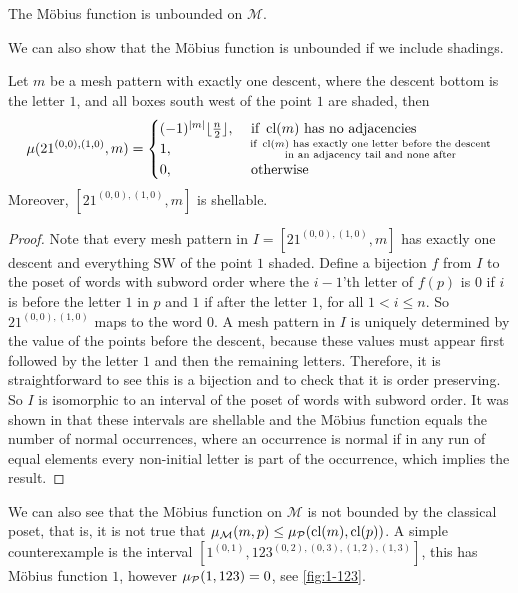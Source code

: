 \documentclass[11pt,a4paper,oneside]{article}
\begin{document}
\begin{cor}
The M\"obius function is unbounded on $\mathcal{M}$.
\end{cor}

We can also show that the M\"obius function is unbounded if we include shadings.
\begin{lem}\label{lem:mobUn}
Let $m$ be a mesh pattern with exactly one descent, where the descent bottom is
the letter $1$, and all boxes south west of the point $1$ are shaded, then
$$
\mu(21^{(0,0),(1,0)},m)=\begin{cases}
(-1)^{|m|}\lfloor\frac{n}{2}\rfloor,&\mbox{ if } \operatorname{\textrm{cl}}(m) \mbox{ has no adjacencies}\\
1,&\substack{ \text{ if } \operatorname{\textrm{cl}}(m) \text{ has exactly one letter before the descent} \\
\text{ in an adjacency tail and none after}}\\
0, &\mbox{ otherwise}
\end{cases}
$$
Moreover, $[21^{(0,0),(1,0)},m]$ is shellable.
\begin{proof}
Note that every mesh pattern in $I=[21^{(0,0),(1,0)},m]$ has exactly one descent
and everything SW of the point $1$ shaded. Define a bijection $f$ from $I$ to
the poset of words with subword order where the $i-1$'th letter of $f(p)$ is $0$
if $i$ is before the letter $1$ in $p$ and $1$ if after the letter $1$, for all
$1<i\le n$. So $21^{(0,0),(1,0)}$ maps to the word $0$. A mesh pattern in $I$ is
uniquely determined by the value of the points before the descent, because these
values must appear first followed by the letter $1$ and then the remaining
letters. Therefore, it is straightforward to see this is a bijection and to
check that it is order preserving. So $I$ is isomorphic to an interval of the
poset of words with subword order. It was shown in \cite{Bjo90} that these
intervals are shellable and the M\"obius function equals the number of normal
occurrences, where an occurrence is normal if in any run of equal elements every
non-initial letter is part of the occurrence, which implies the result.
\end{proof}
\end{lem}

We can also see that the M\"obius function on $\mathcal{M}$ is not bounded by
the classical poset, that is, it is not true that $\operatorname{\mu_\mathcal{M}}(m,p)\le
\operatorname{\mu_\mathcal{P}}(\operatorname{\textrm{cl}}(m),\operatorname{\textrm{cl}}(p))$. A simple counterexample is the interval
$[1^{(0,1)},123^{(0,2),(0,3),(1,2),(1,3)}]$, this has M\"obius function $1$,
however $\operatorname{\mu_\mathcal{P}}(1,123)=0$, see \cref{fig:1-123}.
\end{document}
